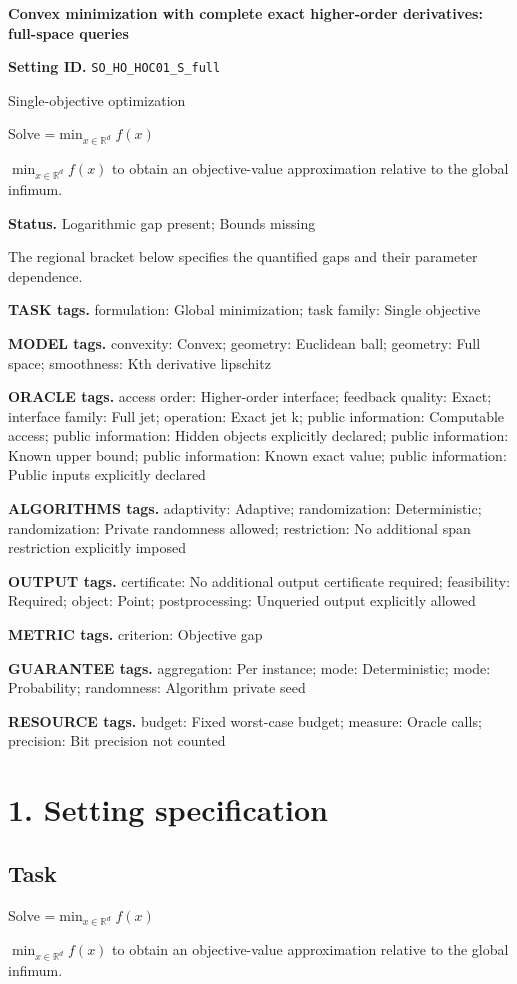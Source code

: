 \documentclass[10pt,a4paper]{article}
\newcommand{\AtlasMath}[1]{\par\begingroup\centering\setbox0=\hbox{$\displaystyle #1$}\ifdim\wd0>1.4\linewidth\typeout{ATLAS WIDE FORMULA: \the\wd0}\fi\ifdim\wd0>\linewidth\resizebox{\linewidth}{!}{\box0}\else\box0\fi\par\endgroup}
\newcommand{\AtlasInlineMath}[1]{\begingroup\setbox0=\hbox{$#1$}\ifdim\wd0>.4\linewidth\endgroup\AtlasMath{#1}\else\endgroup$#1$\fi}
\begin{document}
\raggedright

{\LARGE\bfseries\sffamily\color{AtlasNavy} Convex minimization with complete exact higher-order derivatives: full-space queries\par}\vspace{5pt}
\textbf{Setting ID.} \texttt{SO\_\allowbreak{}HO\_\allowbreak{}HOC01\_\allowbreak{}S\_\allowbreak{}full}

Single-objective optimization

Solve \AtlasInlineMath{\min_{x\in \mathbb{R}^d}f(x)} to obtain an objective-value approximation relative to the global infimum.

\textbf{Status.} Logarithmic gap present; Bounds missing

The regional bracket below specifies the quantified gaps and their parameter dependence.

\textbf{TASK tags.} formulation: Global minimization; task family: Single objective

\textbf{MODEL tags.} convexity: Convex; geometry: Euclidean ball; geometry: Full space; smoothness: Kth derivative lipschitz

\textbf{ORACLE tags.} access order: Higher-order interface; feedback quality: Exact; interface family: Full jet; operation: Exact jet k; public information: Computable access; public information: Hidden objects explicitly declared; public information: Known upper bound; public information: Known exact value; public information: Public inputs explicitly declared

\textbf{ALGORITHMS tags.} adaptivity: Adaptive; randomization: Deterministic; randomization: Private randomness allowed; restriction: No additional span restriction explicitly imposed

\textbf{OUTPUT tags.} certificate: No additional output certificate required; feasibility: Required; object: Point; postprocessing: Unqueried output explicitly allowed

\textbf{METRIC tags.} criterion: Objective gap

\textbf{GUARANTEE tags.} aggregation: Per instance; mode: Deterministic; mode: Probability; randomness: Algorithm private seed

\textbf{RESOURCE tags.} budget: Fixed worst-case budget; measure: Oracle calls; precision: Bit precision not counted

\section{1. Setting specification}
\subsection{Task}
Solve \AtlasInlineMath{\min_{x\in \mathbb{R}^d}f(x)} to obtain an objective-value approximation relative to the global infimum.
\end{document}
